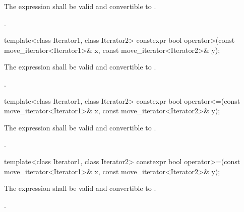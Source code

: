 \begin{itemdescr}
\begin{addedblock}
\pnum
\constraints
The expression  shall be valid and
convertible to .
\end{addedblock}

\pnum
\returns {}.
\end{itemdescr}

%
\begin{itemdecl}
template<class Iterator1, class Iterator2>
constexpr bool operator>(const move_iterator<Iterator1>& x, const move_iterator<Iterator2>& y);
\end{itemdecl}

\begin{itemdescr}
\begin{addedblock}
\pnum
\constraints
The expression  shall be valid and
convertible to .
\end{addedblock}

\pnum
\returns {}.
\end{itemdescr}

%
\begin{itemdecl}
template<class Iterator1, class Iterator2>
constexpr bool operator<=(const move_iterator<Iterator1>& x, const move_iterator<Iterator2>& y);
\end{itemdecl}

\begin{itemdescr}
\begin{addedblock}
\pnum
\constraints
The expression  shall be valid and
convertible to .
\end{addedblock}

\pnum
\returns {}.
\end{itemdescr}

%
\begin{itemdecl}
template<class Iterator1, class Iterator2>
constexpr bool operator>=(const move_iterator<Iterator1>& x, const move_iterator<Iterator2>& y);
\end{itemdecl}

\begin{itemdescr}
\begin{addedblock}
\pnum
\constraints
The expression  shall be valid and
convertible to .
\end{addedblock}

\pnum
\returns {}.
\end{itemdescr}

